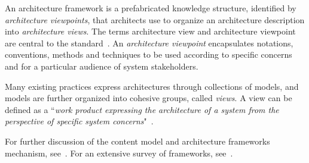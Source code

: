 An architecture framework is a prefabricated knowledge structure, identified by {\em architecture viewpoints}, that
architects use to organize an architecture description into {\em architecture views}.  The terms architecture view and architecture viewpoint are central to the standard~\cite{42010}. 
An {\em architecture viewpoint} encapsulates notations, conventions, methods and techniques to
be used according to specific 
concerns and for a particular audience of system stakeholders. 


Many existing practices express architectures through collections of
models, and models are further organized into cohesive groups, called {\em views}. A view can be defined as a ``{\em work product expressing the architecture of a system from the perspective of specific system concerns}"~\cite{42010}.

For further discussion of the
content model and architecture frameworks mechanism,
see~\cite{Emery-Hilliard:2009}. 
For an extensive survey of
frameworks, see~\cite{AFS}. 
    



